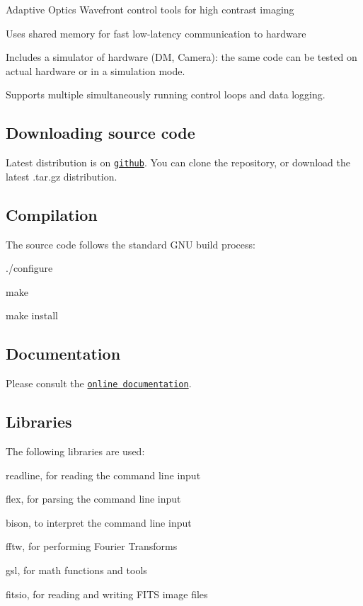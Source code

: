 Adaptive Optics Wavefront control tools for high contrast imaging

Uses shared memory for fast low-\/latency communication to hardware

Includes a simulator of hardware (D\+M, Camera)\+: the same code can be tested on actual hardware or in a simulation mode.

Supports multiple simultaneously running control loops and data logging.

\subsection*{Downloading source code}

Latest distribution is on \href{https://github.com/oguyon/AdaptiveOpticsControl}{\tt github}. You can clone the repository, or download the latest .tar.\+gz distribution.

\subsection*{Compilation}

The source code follows the standard G\+N\+U build process\+:

./configure

make

make install

\subsection*{Documentation}

Please consult the \href{http://oguyon.github.io/AdaptiveOpticsControl/}{\tt online documentation}.

\subsection*{Libraries}

The following libraries are used\+:
\begin{DoxyItemize}
\item readline, for reading the command line input
\item flex, for parsing the command line input
\item bison, to interpret the command line input
\item fftw, for performing Fourier Transforms
\item gsl, for math functions and tools
\item fitsio, for reading and writing F\+I\+T\+S image files
\end{DoxyItemize}

